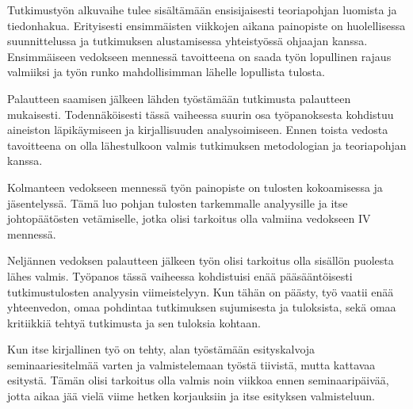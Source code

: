 Tutkimustyön alkuvaihe tulee sisältämään ensisijaisesti
teoriapohjan luomista ja tiedonhakua. Erityisesti ensimmäisten
viikkojen aikana painopiste on huolellisessa suunnittelussa ja
tutkimuksen alustamisessa yhteistyössä ohjaajan kanssa. Ensimmäiseen
vedokseen mennessä tavoitteena on saada työn lopullinen rajaus
valmiiksi ja työn runko mahdollisimman lähelle lopullista tulosta.

Palautteen saamisen jälkeen lähden työstämään tutkimusta
palautteen mukaisesti. Todennäköisesti tässä vaiheessa suurin osa
työpanoksesta kohdistuu aineiston läpikäymiseen ja kirjallisuuden
analysoimiseen. Ennen toista vedosta tavoitteena on olla lähestulkoon
valmis tutkimuksen metodologian ja teoriapohjan kanssa.

Kolmanteen vedokseen mennessä työn painopiste on tulosten kokoamisessa
ja jäsentelyssä. Tämä luo pohjan tulosten tarkemmalle analyysille ja
itse johtopäätösten vetämiselle, jotka olisi tarkoitus olla valmiina
vedokseen IV mennessä.

Neljännen vedoksen palautteen jälkeen työn olisi tarkoitus olla
sisällön puolesta lähes valmis. Työpanos tässä vaiheessa
kohdistuisi enää pääsääntöisesti tutkimustulosten analyysin
viimeistelyyn. Kun tähän on päästy, työ vaatii enää yhteenvedon,
omaa pohdintaa tutkimuksen sujumisesta ja tuloksista, sekä omaa
kritiikkiä tehtyä tutkimusta ja sen tuloksia kohtaan.

Kun itse kirjallinen työ on tehty, alan työstämään esityskalvoja
seminaariesitelmää varten ja valmistelemaan työstä tiivistä,
mutta kattavaa esitystä. Tämän olisi tarkoitus olla valmis noin
viikkoa ennen seminaaripäivää, jotta aikaa jää vielä viime hetken
korjauksiin ja itse esityksen valmisteluun.
